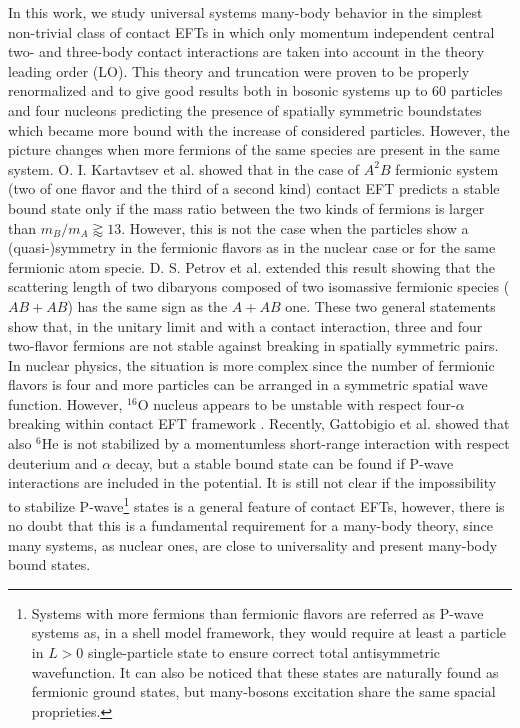 \documentclass[preprint,12pt]{elsarticle}
\begin{document}
In this work, we study universal systems many-body behavior in the simplest non-trivial class of contact EFTs in which only momentum independent central two- and three-body contact interactions are taken into account in the theory leading order (LO).
This theory and truncation were proven to be properly renormalized and to give good results both in bosonic systems up to 60 particles \cite{manybosons} and four nucleons \cite{Barnea:2013uqa} predicting the presence of spatially symmetric boundstates which became more bound with the increase of considered particles.
However, the picture changes when more fermions of the same species are present in the same system.
O. I. Kartavtsev et al.  \cite{Kartavtsev_2007} showed that in the case of $A^2B$ fermionic system (two of one flavor and the third of a second kind) contact EFT predicts a stable bound state only if the mass ratio between the two kinds of fermions is larger than $m_B/m_A \gtrapprox 13 $.
However, this is not the case when the particles show a (quasi-)symmetry in the fermionic flavors as in the nuclear case or for the same fermionic atom specie.
D. S. Petrov et al. \cite{petrov_dimerov, Petrov:2005zz,PhysRevA.92.053624} extended this result showing that the scattering length of two dibaryons composed of two isomassive fermionic species ($AB+AB$) has the same sign as the $A+AB$ one.
These two general statements show that, in the unitary limit and with a contact interaction, three and four two-flavor fermions are not stable against breaking in spatially symmetric pairs.
In nuclear physics, the situation is more complex since the number of fermionic flavors is four and more particles can be arranged in a symmetric spatial wave function.
However, $^{16}$O nucleus appears to be unstable with respect four-$\alpha$ breaking within contact EFT framework \cite{Contessi:2017rww}.
Recently, Gattobigio et al. \cite{Gattobigio:2019omi} showed that also $^{6}$He is not stabilized by a momentumless short-range interaction with respect deuterium and $\alpha$ decay, but a stable bound state can be found if P-wave interactions are included in the potential.
It is still not clear if the impossibility to stabilize P-wave\footnote{Systems with more fermions than fermionic flavors are referred as P-wave systems as, in a shell model framework, they would require at least a particle in $L>0$ single-particle state to ensure correct total antisymmetric wavefunction. It can also be noticed that these states are naturally found as fermionic ground states, but many-bosons excitation share the same spacial proprieties.}  states is a general feature of contact EFTs, however, there is no doubt that this is a fundamental requirement for a many-body theory, since many systems, as nuclear ones, are close to universality and present many-body bound states.
\end{document}
